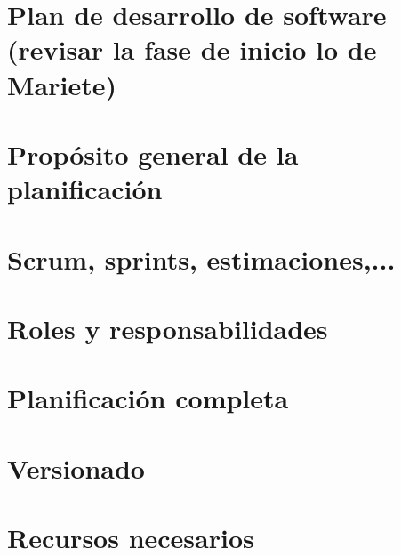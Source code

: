 \documentclass[../pfc.tex]{subfiles}
\begin{document}
	
	\section{Plan de desarrollo de software (revisar la fase de inicio lo de Mariete)}

	\section{Propósito general de la planificación}
	
	\section{Scrum, sprints, estimaciones,... }
	
	\section{Roles y responsabilidades}
	
	\section{Planificación completa}
	
	\section{Versionado}
	
	\section{Recursos necesarios}


	
\end{document}
